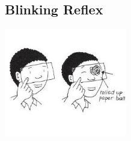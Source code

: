 \begin{multicols}{2}
%
%

\subsection{Blinking Reflex}

\begin{center}
\includegraphics[width=0.4\textwidth]{./img/vso/blinking.jpg}
\end{center}


\end{multicols}

